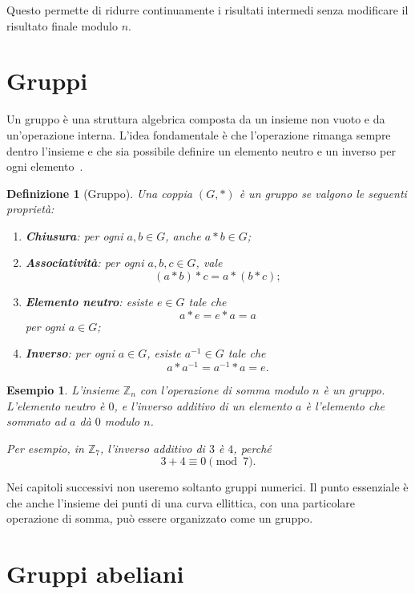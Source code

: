 \documentclass[12pt,a4paper,oneside]{report}
\newtheorem{definition}{Definizione}[chapter]
\newtheorem{example}{Esempio}[chapter]
\begin{document}
Questo permette di ridurre continuamente i risultati intermedi senza modificare il risultato finale modulo \(n\).

\section{Gruppi}

Un gruppo è una struttura algebrica composta da un insieme non vuoto e da un'operazione interna. L'idea fondamentale è che l'operazione rimanga sempre dentro l'insieme e che sia possibile definire un elemento neutro e un inverso per ogni elemento~\cite{margara_dh,margara_ec}.

\begin{definition}[Gruppo]
Una coppia \((G,\ast)\) è un gruppo se valgono le seguenti proprietà:
\begin{enumerate}
    \item \textbf{Chiusura}: per ogni \(a,b \in G\), anche \(a \ast b \in G\);
    \item \textbf{Associatività}: per ogni \(a,b,c \in G\), vale
    \[
    (a \ast b) \ast c = a \ast (b \ast c);
    \]
    \item \textbf{Elemento neutro}: esiste \(e \in G\) tale che
    \[
    a \ast e = e \ast a = a
    \]
    per ogni \(a \in G\);
    \item \textbf{Inverso}: per ogni \(a \in G\), esiste \(a^{-1} \in G\) tale che
    \[
    a \ast a^{-1} = a^{-1} \ast a = e.
    \]
\end{enumerate}
\end{definition}

\begin{example}
L'insieme \(\mathbb{Z}_n\) con l'operazione di somma modulo \(n\) è un gruppo. L'elemento neutro è \(0\), e l'inverso additivo di un elemento \(a\) è l'elemento che sommato ad \(a\) dà \(0\) modulo \(n\).

Per esempio, in \(\mathbb{Z}_7\), l'inverso additivo di \(3\) è \(4\), perché
\[
3+4 \equiv 0 \pmod 7.
\]
\end{example}

Nei capitoli successivi non useremo soltanto gruppi numerici. Il punto essenziale è che anche l'insieme dei punti di una curva ellittica, con una particolare operazione di somma, può essere organizzato come un gruppo.

\section{Gruppi abeliani}
\end{document}
